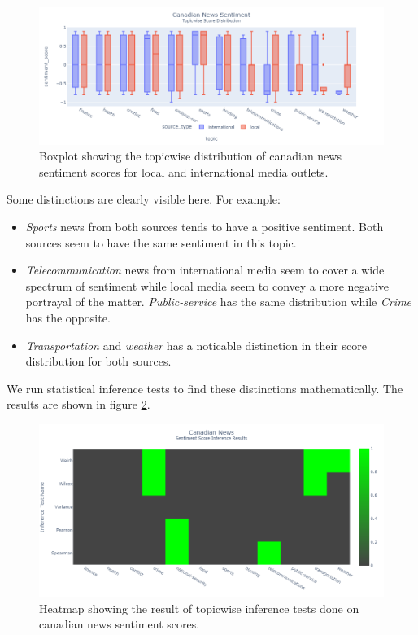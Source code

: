 \documentclass{article}
\theoremstyle{mytheoremstyle}
\theoremstyle{mytheoremstyle}
\theoremstyle{myproblemstyle}
\begin{document}
    \begin{figure}[hp]
        \centering
        \includegraphics[width=\linewidth]{../images/plots/Canada/canada_boxplot_sentiment.png}
        \caption{Boxplot showing the topicwise distribution of canadian news sentiment scores for local and international media outlets.}
        \label{fig:canada_sentiment_score_boxplot}
    \end{figure}

    Some distinctions are clearly visible here. For example:

    \begin{itemize}
        \item \emph{Sports} news from both sources tends to have a positive sentiment. Both sources seem to have the same sentiment in this topic.
        \item \emph{Telecommunication} news from international media seem to cover a wide spectrum of sentiment while local media seem to convey a more negative portrayal of the matter. \emph{Public-service} has the same distribution while \emph{Crime} has the opposite.
        \item \emph{Transportation} and \emph{weather} has a noticable distinction in their score distribution for both sources.
    \end{itemize}

    We run statistical inference tests to find these distinctions mathematically. The results are shown in figure \ref{fig:canada_sentiment_score_heatmap}.

    \begin{figure}[hp]
        \centering
        \includegraphics[width=\linewidth]{../images/plots/Canada/canada_heatmap_inference_sentiment.png}
        \caption{Heatmap showing the result of topicwise inference tests done on canadian news sentiment scores.}
        \label{fig:canada_sentiment_score_heatmap}
    \end{figure}
\end{document}
